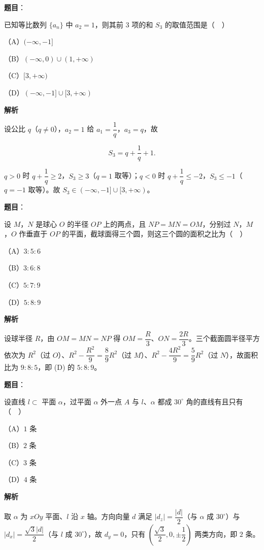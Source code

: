 \begin{answer}

\textbf{题目}：

已知等比数列 $\{a_n\}$ 中 $a_2=1$，则其前 $3$ 项的和 $S_3$ 的取值范围是（　）

（A）$(-\infty,-1]$

（B）$(-\infty,0)\cup(1,+\infty)$

（C）$[3,+\infty)$

（D）$(-\infty,-1]\cup[3,+\infty)$

\textbf{解析}

设公比 $q$（$q\neq0$），$a_2=1$ 给 $a_1=\dfrac1q$，$a_3=q$，故

\nopagebreak[4]
\[S_3=q+\frac1q+1.\]

$q>0$ 时 $q+\dfrac1q\geqslant2$，$S_3\geqslant3$（$q=1$ 取等）；$q<0$ 时 $q+\dfrac1q\leqslant-2$，$S_3\leqslant-1$（$q=-1$ 取等）。故 $S_3\in(-\infty,-1]\cup[3,+\infty)$。


\end{answer}
\begin{answer}

\textbf{题目}：

设 $M$，$N$ 是球心 $O$ 的半径 $OP$ 上的两点，且 $NP=MN=OM$，分别过 $N$，$M$，$O$ 作垂直于 $OP$ 的平面，截球面得三个圆，则这三个圆的面积之比为（　）

（A）$3:5:6$

（B）$3:6:8$

（C）$5:7:9$

（D）$5:8:9$

\textbf{解析}

设球半径 $R$，由 $OM=MN=NP$ 得 $OM=\dfrac R3$、$ON=\dfrac{2R}3$。三个截面圆半径平方依次为 $R^2$（过 $O$）、$R^2-\dfrac{R^2}9=\dfrac89R^2$（过 $M$）、$R^2-\dfrac{4R^2}9=\dfrac59R^2$（过 $N$），故面积比为 $9:8:5$，即 (D) 的 $5:8:9$。


\end{answer}
\begin{answer}

\textbf{题目}：

设直线 $l\subset$ 平面 $\alpha$，过平面 $\alpha$ 外一点 $A$ 与 $l$、$\alpha$ 都成 $30^\circ$ 角的直线有且只有（　）

（A）$1$ 条

（B）$2$ 条

（C）$3$ 条

（D）$4$ 条

\textbf{解析}

取 $\alpha$ 为 $xOy$ 平面、$l$ 沿 $x$ 轴。方向向量 $d$ 满足 $|d_z|=\dfrac{|d|}2$（与 $\alpha$ 成 $30^\circ$）与 $|d_x|=\dfrac{\sqrt3|d|}2$（与 $l$ 成 $30^\circ$），故 $d_y=0$，只有 $\left(\dfrac{\sqrt3}2,0,\pm\dfrac12\right)$ 两类方向，即 $2$ 条。


\end{answer}
